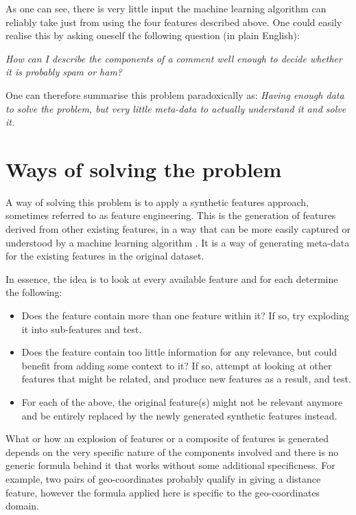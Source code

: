 As one can see, there is very little input the machine learning algorithm can reliably take just from using the four features described above. One could easily realise this by asking oneself the following question (in plain English):

\emph{How can I describe the components of a comment well enough to decide whether it is probably spam or ham?}

One can therefore summarise this problem paradoxically as: \emph{Having enough data to solve the problem, but very little meta-data to actually understand it and solve it.}

\section{Ways of solving the problem}
A way of solving this problem is to apply a synthetic features approach, sometimes referred to as feature engineering. This is the generation of features derived from other existing features, in a way that can be more easily captured or understood by a machine learning algorithm \citep{LiFeatureEng}. It is a way of generating meta-data for the existing features in the original dataset.

In essence, the idea is to look at every available feature and for each determine the following:

\begin{itemize}
    \item Does the feature contain more than one feature within it? If so, try exploding it into sub-features and test.
    \item Does the feature contain too little information for any relevance, but could benefit from adding some context to it? If so, attempt at looking at other features that might be related, and produce new features as a result, and test.
    \item For each of the above, the original feature(s) might not be relevant anymore and be entirely replaced by the newly generated synthetic features instead.
\end{itemize}

What or how an explosion of features or a composite of features is generated depends on the very specific nature of the components involved and there is no generic formula behind it that works without some additional specificness. For example, two pairs of geo-coordinates probably qualify in giving a distance feature, however the formula applied here is specific to the geo-coordinates domain.

